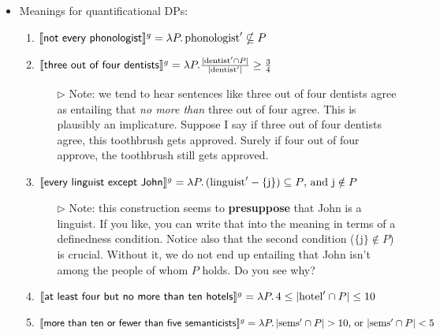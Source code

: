 \begin{itemize}
	\item Meanings for quantificational DPs:%
	\begin{enumerate}
		\item $\llbracket \textsf{not every phonologist} \rrbracket^g = \lambda P.\,\text{phonologist}' \nsubseteq P$%
		
		\item $\llbracket \textsf{three out of four dentists} \rrbracket^g = \lambda P.\frac{|\text{dentist}' \cap P|}{|\text{dentist}'|} \geq \frac{3}{4}$%
		\begin{itemize}
			\item[$\rhd$] Note: we tend to hear sentences like \textsf{three out of four dentists agree} as entailing that \emph{no more than} three out of four agree. This is plausibly an implicature. Suppose I say \textsf{if three out of four dentists agree, this toothbrush gets approved}. Surely if four out of four approve, the toothbrush still gets approved.%
		\end{itemize}
		
		\item $\llbracket \textsf{every linguist except John} \rrbracket^g = \lambda P.\,(\text{linguist}' - \{\text{j}\}) \subseteq P\text{, and }\text{j} \notin P$%
		\begin{itemize}
			\item[$\rhd$] Note: this construction seems to \textbf{presuppose} that John is a linguist. If you like, you can write that into the meaning in terms of a definedness condition. Notice also that the second condition ($\{\text{j}\} \notin P$) is crucial. Without it, we do not end up entailing that John isn't among the people of whom $P$ holds. Do you see why?%
		\end{itemize}
		
		\item $\llbracket \textsf{at least four but no more than ten hotels} \rrbracket^g = \lambda P.\, 4 \leq |\text{hotel}' \cap P| \leq 10$%
		
		\item $\llbracket \textsf{more than ten or fewer than five semanticists} \rrbracket^g = \lambda P.\,|\text{sems}' \cap P| > 10\text{, or }|\text{sems}' \cap P| < 5$%
	\end{enumerate}
	

\end{itemize}
